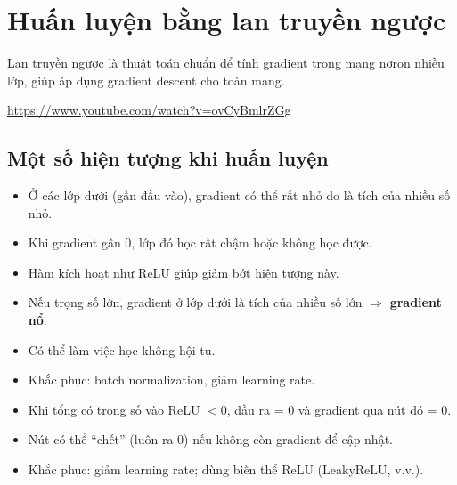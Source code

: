 \documentclass[12pt,a4paper]{article}
\begin{document}
\section{Huấn luyện bằng lan truyền ngược}

\begin{dinhnghia}[title={Backpropagation}]
\href{https://developers.google.com/machine-learning/glossary\#backpropagation}{Lan truyền ngược} là thuật toán chuẩn để tính gradient trong mạng nơron nhiều lớp, giúp áp dụng gradient descent cho toàn mạng.
\end{dinhnghia}

\begin{ungdung}[title={Video trực quan}]
\url{https://www.youtube.com/watch?v=ovCyBmlrZGg}
\end{ungdung}

\subsection{Một số hiện tượng khi huấn luyện}

\begin{tinhchat}[title={Vanishing gradient}]
\begin{itemize}
  \item Ở các lớp dưới (gần đầu vào), gradient có thể rất nhỏ do là tích của nhiều số nhỏ.
  \item Khi gradient gần 0, lớp đó học rất chậm hoặc không học được.
  \item Hàm kích hoạt như ReLU giúp giảm bớt hiện tượng này.
\end{itemize}
\end{tinhchat}

\begin{tinhchat}[title={Exploding gradient}]
\begin{itemize}
  \item Nếu trọng số lớn, gradient ở lớp dưới là tích của nhiều số lớn $\Rightarrow$ \textbf{gradient nổ}.
  \item Có thể làm việc học không hội tụ.
  \item Khắc phục: batch normalization, giảm learning rate.
\end{itemize}
\end{tinhchat}

\begin{tinhchat}[title={Dead ReLU units}]
\begin{itemize}
  \item Khi tổng có trọng số vào ReLU $<0$, đầu ra = 0 và gradient qua nút đó = 0.
  \item Nút có thể ``chết'' (luôn ra 0) nếu không còn gradient để cập nhật.
  \item Khắc phục: giảm learning rate; dùng biến thể ReLU (LeakyReLU, v.v.).
\end{itemize}
\end{tinhchat}
\end{document}
